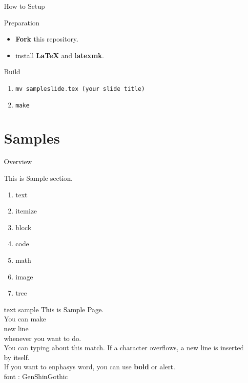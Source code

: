 \documentclass[aspectratio=1610,14pt]{beamer}
\begin{document}
\begin{frame}{How to Setup}
    \begin{textblock}{Preparation}
        \begin{itemize}
            \item{\textbf{Fork} this repository.}
            \item{install \textbf{LaTeX} and \textbf{latexmk}.}
        \end{itemize}
    \end{textblock}

    \begin{textblock}{Build}
        \begin{enumerate}
            \item{\lstinline|mv sampleslide.tex (your slide title)|}
            \item{\lstinline|make|}
        \end{enumerate}
    \end{textblock}
\end{frame}

\section{Samples}
\begin{frame}
    \tableofcontents[currentsection]
\end{frame}

\begin{frame}{Overview}
    \begin{textblock}{This is Sample section.}
        \begin{enumerate}
            \item{text}
            \item{itemize}
            \item{block}
            \item{code}
            \item{math}
            \item{image} 
            \item{tree}
        \end{enumerate}
    \end{textblock}
\end{frame}

\begin{frame}{text sample}
    This is Sample Page.\\
    You can make \\
    \alert{new line}\\
    whenever you want to do.\\
    You can typing about this match. If a character overflows, a new line is inserted by itself.\\
    If you want to enphasys word, you can use \textbf{bold} or \alert{alert}. \\
    font : GenShinGothic
\end{frame}
\end{document}
